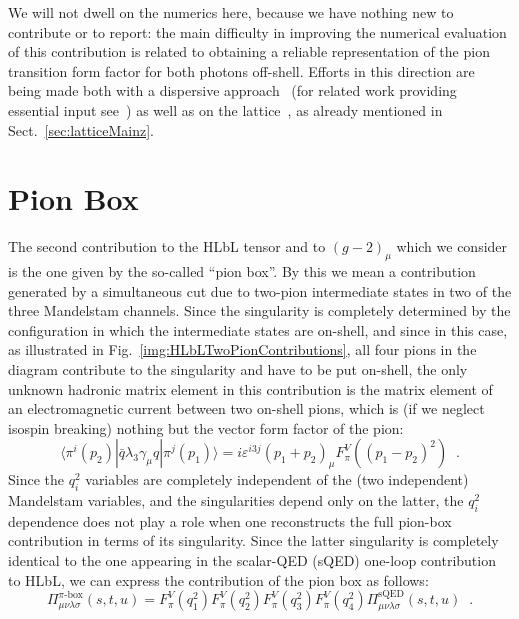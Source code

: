\documentclass[epj]{webofc}
\newcommand{\<}{\langle}
\renewcommand{\>}{\rangle}
\begin{document}
We will not dwell on the numerics here, because we have nothing new to
contribute or to report: the main difficulty in improving the
numerical evaluation of this contribution is related to obtaining a
reliable representation of the pion transition form factor for both photons
off-shell. Efforts in this direction are being made both with a dispersive
approach~\cite{Hoferichter:2014vra} (for related work providing essential
input see~\cite{Hoferichter:2012pm,Hoferichter:2017ftn}) as well as on the
lattice~\cite{Gerardin:2016cqj,GerardinLat17}, as already mentioned in
Sect.~\ref{sec:latticeMainz}.  


\section{Pion Box}\label{pi-box}
The second contribution to the HLbL tensor and to $(g-2)_\mu$ which we
consider is the one given by the so-called ``pion box''. By this we mean a
contribution generated by a simultaneous cut due to two-pion intermediate
states in two of the three Mandelstam channels. Since the singularity is
completely determined by the configuration in which the intermediate states
are on-shell, and since in this case, as illustrated in
Fig.~\ref{img:HLbLTwoPionContributions}, all four pions in the diagram
contribute to the singularity and have to be put on-shell, the only unknown
hadronic matrix element in this contribution is the matrix element of an
electromagnetic current between two on-shell pions, which is (if we neglect
isospin breaking) nothing but the vector form factor of the pion:
\begin{equation}
\langle \pi^i(p_2)| \bar q \lambda_3 \gamma_\mu q | \pi^j(p_1) \rangle = i
\varepsilon^{i3j} (p_1+p_2)_\mu F^V_\pi((p_1-p_2)^2) \; \; .
\end{equation}
Since the $q_i^2$ variables are completely independent of the (two
independent) Mandelstam variables, and the singularities depend only on the
latter, the $q_i^2$ dependence does not play a role when one
reconstructs the full pion-box contribution in terms of its singularity.
Since the latter singularity is completely identical to the one
appearing in the scalar-QED (sQED) one-loop contribution to HLbL, we can
express the contribution of the pion box as follows:
\begin{equation}
\Pi_{\mu\nu\lambda\sigma}^{\pi\text{-box}}(s,t,u)=F^V_\pi(q_1^2)F^V_\pi(q_2^2)F^V_\pi(q_3^2)
F^V_\pi(q_4^2) \Pi_{\mu\nu\lambda\sigma}^{\text{sQED}}(s,t,u) \; \; .
\label{eq:pion-box}
\end{equation}
\end{document}
